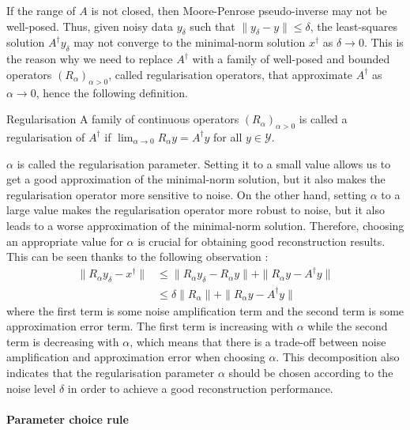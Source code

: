 If the range of $A$ is not closed, then Moore-Penrose pseudo-inverse may not be well-posed.
Thus, given noisy data $y_\delta$ such that $\| y_\delta - y \| \leq \delta$, the least-squares solution $A^\dagger y_\delta$ may not converge to the minimal-norm solution $x^\dagger$ as $\delta \to 0$.
This is the reason why we need to replace $A^\dagger$ with a family of well-posed and bounded operators $(R_\alpha)_{\alpha > 0}$, called regularisation operators, that approximate $A^\dagger$ as $\alpha \to 0$, hence the following definition.

\begin{definition}{Regularisation}
    A family of continuous operators $(R_\alpha)_{\alpha > 0}$ is called a regularisation of $A^\dagger$ if $\lim_{\alpha \to 0} R_\alpha y = A^\dagger y$ for all $y \in \mathcal{Y}$.
\end{definition}

$\alpha$ is called the regularisation parameter. Setting it to a small value allows us to get a good approximation of the minimal-norm solution, but it also makes the regularisation operator more sensitive to noise. On the other hand, setting $\alpha$ to a large value makes the regularisation operator more robust to noise, but it also leads to a worse approximation of the minimal-norm solution. Therefore, choosing an appropriate value for $\alpha$ is crucial for obtaining good reconstruction results.
This can be seen thanks to the following observation :
\begin{equation*}
    \begin{aligned}
        \| R_\alpha y_\delta - x^\dagger \| &\leq \| R_\alpha y_\delta - R_\alpha y \| + \| R_\alpha y - A^\dagger y \| \\
        & \leq \delta \| R_\alpha \| + \| R_\alpha y - A^\dagger y \|
    \end{aligned}
\end{equation*}
where the first term is some noise amplification term and the second term is some approximation error term. The first term is increasing with $\alpha$ while the second term is decreasing with $\alpha$, which means that there is a trade-off between noise amplification and approximation error when choosing $\alpha$.
This decomposition also indicates that the regularisation parameter $\alpha$ should be chosen according to the noise level $\delta$ in order to achieve a good reconstruction performance.

\paragraph{Parameter choice rule}


